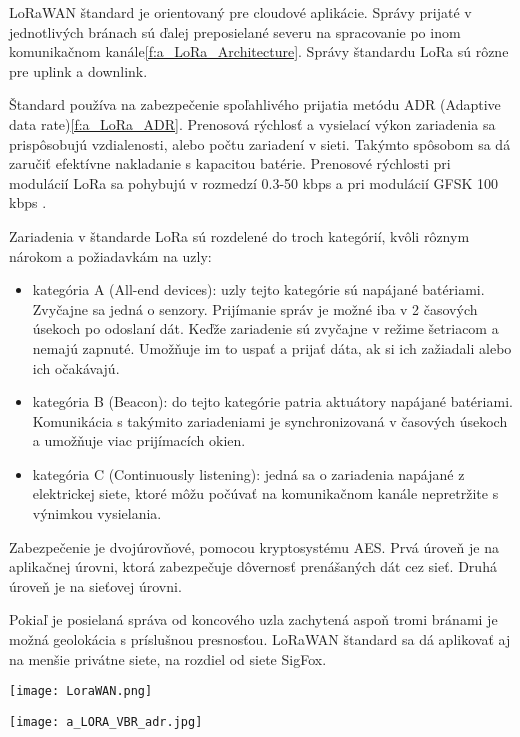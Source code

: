 \documentclass[12pt,a4paper,oneside,openright]{report}
\begin{document}
LoRaWAN štandard je orientovaný pre cloudové aplikácie. Správy prijaté v jednotlivých bránach sú ďalej preposielané severu na spracovanie po inom komunikačnom kanále\ref{f:a_LoRa_Architecture}.
Správy štandardu LoRa sú rôzne pre uplink a downlink.

Štandard používa na zabezpečenie spoľahlivého prijatia metódu ADR (Adaptive data rate)\ref{f:a_LoRa_ADR}. Prenosová rýchlosť a vysielací výkon zariadenia sa prispôsobujú vzdialenosti, alebo počtu zariadení v sieti. Takýmto spôsobom sa dá zaručiť efektívne nakladanie s kapacitou batérie. Prenosové rýchlosti pri modulácií LoRa sa pohybujú v rozmedzí 0.3-50 kbps a pri modulácií GFSK 100 kbps \cite{LoRaFAQ}.

Zariadenia v štandarde LoRa sú rozdelené do troch kategórií, kvôli rôznym nárokom a požiadavkám na uzly:
\begin{itemize}
	\item kategória A (All-end devices): uzly tejto kategórie sú napájané batériami. Zvyčajne sa jedná o senzory. Prijímanie správ je možné iba v 2 časových úsekoch po odoslaní dát. Keďže zariadenie sú zvyčajne v režime šetriacom a nemajú zapnuté. Umožňuje im to uspať a prijať dáta, ak si ich zažiadali alebo ich očakávajú.
	\item kategória B (Beacon): do tejto kategórie patria aktuátory napájané batériami. Komunikácia s takýmito zariadeniami je synchronizovaná v časových úsekoch a umožňuje viac prijímacích okien.
	\item kategória C (Continuously listening): jedná sa o zariadenia napájané z elektrickej siete, ktoré môžu počúvať na komunikačnom kanále nepretržite s výnimkou vysielania.
\end{itemize}

Zabezpečenie je dvojúrovňové, pomocou kryptosystému AES. Prvá úroveň je na aplikačnej úrovni, ktorá zabezpečuje dôvernosť prenášaných dát cez sieť. Druhá úroveň je na sieťovej úrovni.

Pokiaľ je posielaná správa od koncového uzla zachytená aspoň tromi bránami je možná geolokácia s príslušnou presnosťou. LoRaWAN štandard sa dá aplikovať aj na menšie privátne siete, na rozdiel od siete SigFox.

\begin{figure*}[!htb]
	\centering
	\texttt{[image: LoraWAN.png]}
	\caption{Architektúra LoRaWAN\cite{LoRaOverview}.}
	\label{f:a_LoRaWAN}
\end{figure*}


\begin{figure*}[!htb]
	\centering
	\texttt{[image: a\_LORA\_VBR\_adr.jpg]}
	\caption{Prispôsobovanie výkonu a prenosovej rýchlosti v závislosti od vzdialenosti komunikujúcich uzlov.\cite{LoRa_VBR}}
	\label{f:a_LoRa_ADR}
\end{figure*}
\end{document}
